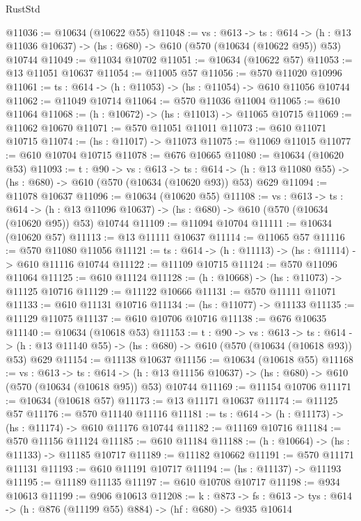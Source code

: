 \begin{lexlean}{RustStd}
\begin{coremodule}
@11036 := @10634 (@10622 @55)
@11048 := {vs : @613} ->
  {ts : @614} ->
  (h : @13 @11036 @10637) -> (hs : @680) -> @610 (@570 (@10634 (@10622 @95)) @53) @10744
@11049 := @11034 @10702
@11051 := @10634 (@10622 @57)
@11053 := @13 @11051 @10637
@11054 := @11005 @57
@11056 := @570 @11020 @10996
@11061 := {ts : @614} -> (h : @11053) -> (hs : @11054) -> @610 @11056 @10744
@11062 := @11049 @10714
@11064 := @570 @11036 @11004
@11065 := @610 @11064
@11068 := (h : @10672) -> (hs : @11013) -> @11065 @10715
@11069 := @11062 @10670
@11071 := @570 @11051 @11011
@11073 := @610 @11071 @10715
@11074 := (hs : @11017) -> @11073
@11075 := @11069 @11015
@11077 := @610 @10704 @10715
@11078 := @676 @10665
@11080 := @10634 (@10620 @53)
@11093 := {t : @90} ->
  {vs : @613} ->
  {ts : @614} -> (h : @13 @11080 @55) -> (hs : @680) -> @610 (@570 (@10634 (@10620 @93)) @53) @629
@11094 := @11078 @10637
@11096 := @10634 (@10620 @55)
@11108 := {vs : @613} ->
  {ts : @614} ->
  (h : @13 @11096 @10637) -> (hs : @680) -> @610 (@570 (@10634 (@10620 @95)) @53) @10744
@11109 := @11094 @10704
@11111 := @10634 (@10620 @57)
@11113 := @13 @11111 @10637
@11114 := @11065 @57
@11116 := @570 @11080 @11056
@11121 := {ts : @614} -> (h : @11113) -> (hs : @11114) -> @610 @11116 @10744
@11122 := @11109 @10715
@11124 := @570 @11096 @11064
@11125 := @610 @11124
@11128 := (h : @10668) -> (hs : @11073) -> @11125 @10716
@11129 := @11122 @10666
@11131 := @570 @11111 @11071
@11133 := @610 @11131 @10716
@11134 := (hs : @11077) -> @11133
@11135 := @11129 @11075
@11137 := @610 @10706 @10716
@11138 := @676 @10635
@11140 := @10634 (@10618 @53)
@11153 := {t : @90} ->
  {vs : @613} ->
  {ts : @614} -> (h : @13 @11140 @55) -> (hs : @680) -> @610 (@570 (@10634 (@10618 @93)) @53) @629
@11154 := @11138 @10637
@11156 := @10634 (@10618 @55)
@11168 := {vs : @613} ->
  {ts : @614} ->
  (h : @13 @11156 @10637) -> (hs : @680) -> @610 (@570 (@10634 (@10618 @95)) @53) @10744
@11169 := @11154 @10706
@11171 := @10634 (@10618 @57)
@11173 := @13 @11171 @10637
@11174 := @11125 @57
@11176 := @570 @11140 @11116
@11181 := {ts : @614} -> (h : @11173) -> (hs : @11174) -> @610 @11176 @10744
@11182 := @11169 @10716
@11184 := @570 @11156 @11124
@11185 := @610 @11184
@11188 := (h : @10664) -> (hs : @11133) -> @11185 @10717
@11189 := @11182 @10662
@11191 := @570 @11171 @11131
@11193 := @610 @11191 @10717
@11194 := (hs : @11137) -> @11193
@11195 := @11189 @11135
@11197 := @610 @10708 @10717
@11198 := @934 @10613
@11199 := @906 @10613
@11208 := {k : @873} ->
  {fs : @613} -> {tys : @614} -> (h : @876 (@11199 @55) @884) -> (hf : @680) -> @935 @10614

\end{coremodule}
\end{lexlean}
